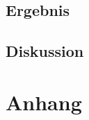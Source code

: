 \documentclass[oneside,10pt,a4paper]{report}
\begin{document}
		\section{Ergebnis}
		\section{Diskussion}

	
	\chapter{Anhang}

	
	
	
	
	\nocite{*}
	
	\newpage
\end{document}

